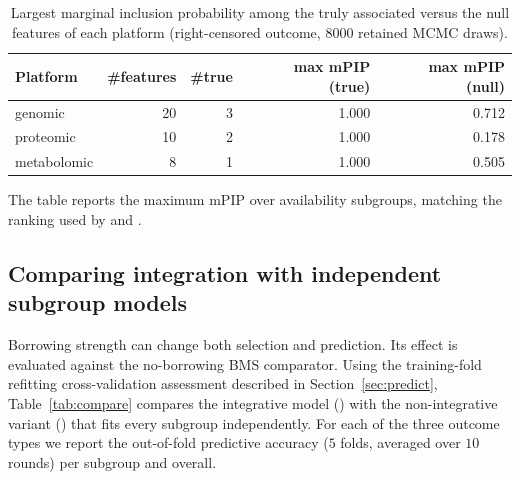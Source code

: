 \documentclass[article]{jss}
\begin{document}
\begin{table}[!htbp]
\centering
\begin{tabular}{l r r r r}
\toprule
Platform & \#features & \#true & max mPIP (true) & max mPIP (null) \\
\midrule
genomic     & 20 & 3 & 1.000 & 0.712 \\
proteomic   & 10 & 2 & 1.000 & 0.178 \\
metabolomic &  8 & 1 & 1.000 & 0.505 \\
\bottomrule
\end{tabular}
\caption{\label{tab:recovery}Largest marginal inclusion probability among the
truly associated versus the null features of each platform (right-censored
outcome, 8000 retained MCMC draws).}
\end{table}

The table reports
the maximum mPIP over availability subgroups, matching the ranking used by
 and .

\subsection{Comparing integration with independent subgroup models}\label{sec:gain}

Borrowing strength can change both selection and prediction. Its effect is
evaluated against the no-borrowing BMS comparator. Using the training-fold refitting cross-validation
assessment described in Section~\ref{sec:predict},
Table~\ref{tab:compare} compares the integrative model ()
with the non-integrative variant () that fits every
subgroup independently. For each of the three outcome types we report the
out-of-fold predictive accuracy
($5$ folds, averaged over $10$ rounds) per subgroup and overall.
\end{document}
